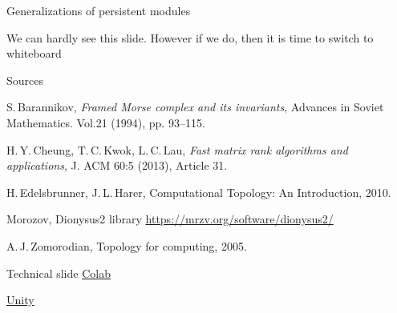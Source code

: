 \documentclass[10pt,xcolor={usenames}]{beamer}
\begin{document}
\begin{frame}{Generalizations of persistent modules}

We can hardly see this slide. However if we do, then it is time to switch to whiteboard

\end{frame}



\begin{frame}{Sources}

\begin{thebibliography}{12}

 S.\,Barannikov, \textit{Framed Morse complex and its invariants}, Advances in Soviet Mathematics. Vol.21 (1994), pp. 93--115.

 H.\,Y.\,Cheung, T.\,C.\,Kwok, L.\,C.\,Lau, \textit{Fast matrix rank algorithms and applications}, J. ACM 60:5 (2013), Article 31.

 H.\,Edelsbrunner, J.\,L.\,Harer, Computational Topology: An Introduction, 2010.

 Morozov, Dionysus2 library \href{https://mrzv.org/software/dionysus2/}{https://mrzv.org/software/dionysus2/}

 A.\,J.\,Zomorodian, Topology for computing, 2005.

\end{thebibliography}

\end{frame}



\begin{frame}{Technical slide}
\href{https://colab.research.google.com/drive/146yQdZBsPGfYZwi1AGKJwSE5wjRwPnc1?usp=sharing}{Colab}

\href{https://play.unity.com/mg/other/builds-4z-1}{Unity}

\begin{center}
\end{center}
\end{frame}
\end{document}
